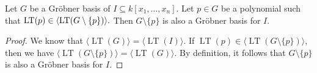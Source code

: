 \begin{lemma}\label{lem:grobner_basis_remove_redundant} %
    Let $G$ be a Gr{\"o}bner basis of $I \subseteq k[x_1, \ldots, x_n]$.  
    Let $p \in G$ be a polynomial such that $\operatorname{LT}(p) \in \langle \operatorname{LT}(G \setminus \{p\}) \rangle.$  
    Then $G \setminus \{p\}$ is also a Gr{\"o}bner basis for $I$.
\end{lemma}
\begin{proof}
  \leanok
  We know that $\langle\operatorname{LT}(G)\rangle = \langle\operatorname{LT}(I)\rangle$. 
  If $\operatorname{LT}(p) \in \langle\operatorname{LT}(G \setminus \{p\})\rangle$, then we have $\langle\operatorname{LT}(G \setminus \{p\})\rangle = \langle\operatorname{LT}(G)\rangle$.
  By definition, it follows that $G \setminus \{p\}$ is also a Gr\"{o}bner basis for $I$.
\end{proof}
    